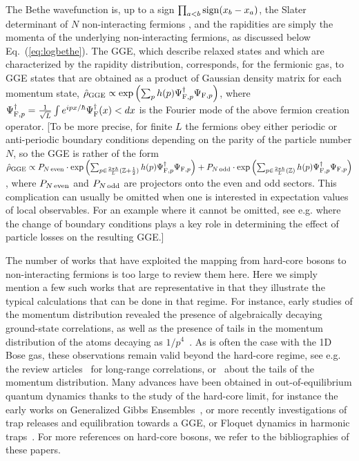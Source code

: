\documentclass[onecolumn,amsfonts,showpacs,superscriptaddress]{revtex4-1}
\begin{document}
The Bethe wavefunction is, up to a sign $\prod_{a<b} {{\rm sign} (x_b-x_a)}$, the Slater determinant of $N$ non-interacting fermions  \citep{girardeau1960relationship},  and the rapidities are simply the momenta of the underlying non-interacting fermions, as discussed below Eq.~(\ref{eq:logbethe}). The GGE, which describe relaxed states and which are characterized by the rapidity distribution, corresponds, for the fermionic gas, to GGE states that are obtained as a product of Gaussian density matrix for each momentum state, $\hat{\rho}_{\rm GGE} \propto \exp \left( \sum_p h(p) \Psi^\dagger_{{\rm F},p} \Psi_{{\rm F},p} \right)$, where $\Psi^\dagger_{{\rm F},p} = \frac{1}{\sqrt{L}} \int e^{i p x/\hbar} \Psi^\dagger_{\rm F}(x)< dx$ is the Fourier mode of the above fermion creation operator. [To be more precise, for finite $L$ the fermions obey either periodic or anti-periodic boundary conditions depending on the parity of the particle number $N$, so the GGE is rather of the form $\hat{\rho}_{\rm GGE} \propto P_{N \,{\rm even}} \cdot \exp \left( \sum_{p \in \frac{2\pi \hbar}{L} (\mathbb{Z} + \frac{1}{2})} h(p) \Psi^\dagger_{{\rm F},p} \Psi_{{\rm F},p} \right) + P_{N \,{\rm odd}} \cdot \exp \left( \sum_{p \in \frac{2\pi \hbar}{L} (\mathbb{Z})} h(p) \Psi^\dagger_{{\rm F},p} \Psi_{{\rm F},p} \right)$, where $P_{N \,{\rm even}}$ and $P_{N \,{\rm odd}}$ are projectors onto the even and odd sectors. This complication can usually be omitted when one is interested in expectation values of local observables. For an example where it cannot be omitted, see e.g. \citep{bouchoule_effect_2020} where the change of boundary conditions plays a key role in determining the effect of particle losses on the resulting GGE.]

The number of works that have exploited the mapping from hard-core bosons to non-interacting fermions is too large to review them here. Here we simply mention a few such works that are  representative in that they illustrate the typical calculations that can be done in that regime. For instance, early studies of the momentum distribution 
\citep{lenard1964momentum,vaidya1979one} revealed the presence of algebraically decaying ground-state correlations, as well as the presence of tails in the momentum distribution of the atoms decaying as $1/p^{4}$~\citep{minguzzi2002high,rigol2004universal}. As is often the case with the 1D Bose gas, these observations remain valid beyond the hard-core regime, see e.g. the review articles~\citep{cazalilla2004bosonizing,cazalilla2011one} for long-range correlations, or~\citep{olshanii2003short} about the tails of the momentum distribution. 
Many advances have been obtained in out-of-equilibrium quantum dynamics thanks to the study of the hard-core limit, for instance the early works on Generalized Gibbs Ensembles~\citep{rigol2007relaxation}, or more recently investigations of trap releases \citep{collura2013equilibration,collura2013quench} and equilibration towards a GGE, or Floquet dynamics in harmonic traps~\citep{scopa2017one,scopa2018exact}. For more references on hard-core bosons, we refer to the bibliographies of these papers.
\end{document}

